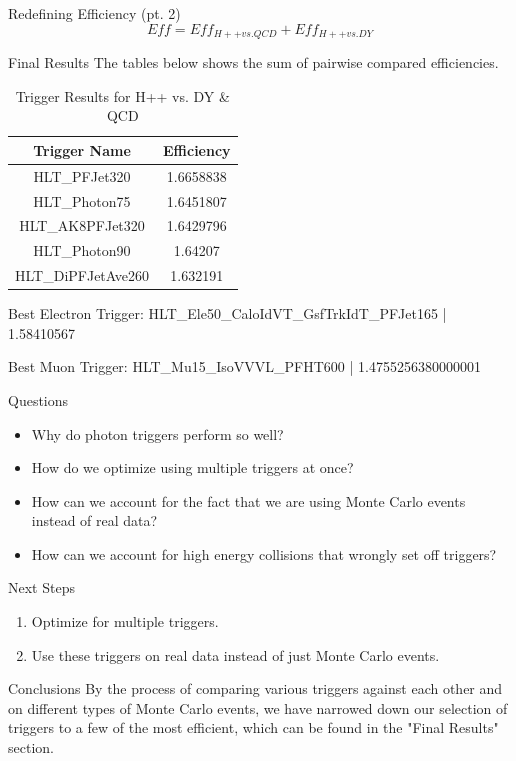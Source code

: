 \documentclass{beamer}
\newlength{\colwidth}
\begin{document}
\begin{frame}[t]
\begin{columns}[t]
\begin{column}{\colwidth}
\begin{block}{Redefining Efficiency (pt. 2)}
    $$Eff = Eff_{H++ vs. QCD} + Eff_{H++ vs. DY}$$
  \end{block}
  \begin{block}{Final Results}
    The tables below shows the sum of pairwise compared efficiencies.

    \begin{table}[h!]
      \caption{\label{table:6}Trigger Results for H++ vs. DY \& QCD}
          \begin{tabular}[t]{c|c}
              \hline
              \textbf{Trigger Name} & \textbf{Efficiency}\\
              \hline
              HLT\_PFJet320 & 1.6658838 \\
              HLT\_Photon75 & 1.6451807 \\
              HLT\_AK8PFJet320 & 1.6429796 \\
              HLT\_Photon90 & 1.64207 \\
              HLT\_DiPFJetAve260 & 1.632191
          \end{tabular}
  \end{table}
  Best Electron Trigger: HLT\_Ele50\_CaloIdVT\_GsfTrkIdT\_PFJet165 | 1.58410567

  Best Muon Trigger: HLT\_Mu15\_IsoVVVL\_PFHT600 | 1.4755256380000001
  \end{block}

  \begin{block}{Questions}
    \begin{itemize}
      \item Why do photon triggers perform so well?
      \item How do we optimize using multiple triggers at once?
      \item How can we account for the fact that we are using Monte Carlo events instead of real data?
      \item How can we account for high energy collisions that wrongly set off triggers?
    \end{itemize}
  \end{block}
  \begin{block}{Next Steps}
    \begin{enumerate}
      \item Optimize for multiple triggers.
      \item Use these triggers on real data instead of just Monte Carlo events.
    \end{enumerate}
  \end{block}
  \begin{block}{Conclusions}
    By the process of comparing various triggers against each other and on different types of Monte Carlo events, we have narrowed down our selection of triggers to a few of the most efficient, which can be found in the "Final Results" section. 
  \end{block}



\end{column}
\end{columns}
\end{frame}
\end{document}
